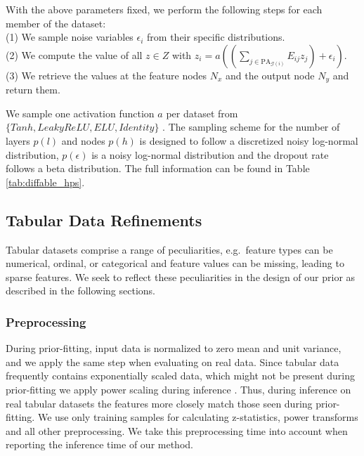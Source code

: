 \documentclass{article}
\begin{document}
With the above parameters fixed, we perform the following steps for each member of the dataset:\\
\hphantom{~~~~}(1) We sample noise variables $\epsilon_i$ from their specific distributions.\\
\hphantom{~~~~}(2) We compute the value of all $z \in Z$ with $z_i = a((\sum_{j \in \text{PA}_{\mathcal{G}(i)}} E_{ij} z_j) + \epsilon_i)$.\\
\hphantom{~~~~}(3) We retrieve the values at the feature nodes $N_x$ and the output node $N_y$ and return them.

We sample one activation function $a$ per dataset from $\{Tanh, Leaky ReLU, ELU, Identity\}$ \citep{nair2010rectified}. The sampling scheme for the number of layers $p(l)$ and nodes $p(h)$ is designed to follow a discretized noisy log-normal distribution, $p(\epsilon)$ is a noisy log-normal distribution and the dropout rate follows a beta distribution.
The full information can be found in Table \ref{tab:diffable_hps}.


\subsection{Tabular Data Refinements}
\label{sec:tabular data refinement}

Tabular datasets comprise a range of peculiarities, e.g.\ feature types can be numerical, ordinal, or
categorical and feature values can be missing, leading to sparse features. We seek to reflect these peculiarities in the design of our prior as described in the following sections. 

\subsubsection{Preprocessing} \label{app:preprocessing} During prior-fitting, input data is normalized to zero mean and unit variance, and we apply the same step when evaluating on real data. Since tabular data frequently contains exponentially scaled data, which might not be present during prior-fitting we apply power scaling during inference \citep{yeo2000new}. Thus, during inference on real tabular datasets the features more closely match those seen during prior-fitting. We use only training samples for calculating z-statistics, power transforms and all other preprocessing. We take this preprocessing time into account when reporting the inference time of our method.
\end{document}
